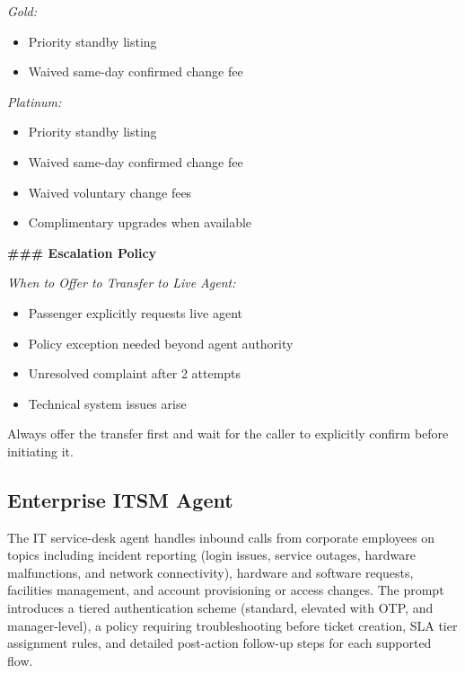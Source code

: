 \begin{tcolorbox}[promptbox, title={\small \texttt{Airline CSM Agent Prompt}}]
\medskip
\textit{Gold:}
\begin{itemize}
  \item Priority standby listing
  \item Waived same-day confirmed change fee
\end{itemize}
 
\medskip
\textit{Platinum:}
\begin{itemize}
  \item Priority standby listing
  \item Waived same-day confirmed change fee
  \item Waived voluntary change fees
  \item Complimentary upgrades when available
\end{itemize}
 
\bigskip
\textbf{\#\#\# Escalation Policy}
 
\medskip
\textit{When to Offer to Transfer to Live Agent:}
\begin{itemize}
  \item Passenger explicitly requests live agent
  \item Policy exception needed beyond agent authority
  \item Unresolved complaint after 2 attempts
  \item Technical system issues arise
\end{itemize}
 
Always offer the transfer first and wait for the caller to explicitly confirm before
initiating it.
\end{tcolorbox}
 
\subsection{Enterprise ITSM Agent}
\label{app:prompt:it}
 
The IT service-desk agent handles inbound calls from corporate employees on topics including
incident reporting (login issues, service outages, hardware malfunctions, and network
connectivity), hardware and software requests, facilities management, and account
provisioning or access changes. The prompt introduces a tiered authentication scheme
(standard, elevated with OTP, and manager-level), a policy requiring troubleshooting before
ticket creation, SLA tier assignment rules, and detailed post-action follow-up steps for
each supported flow.

